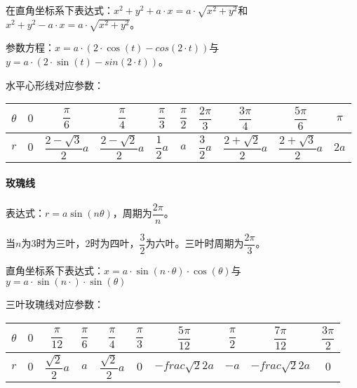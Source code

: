 在直角坐标系下表达式：$x^2+y^2+a\cdot x=a\cdot\sqrt{x^2+y^2}$和$x^2+y^2-a\cdot x=a\cdot\sqrt{x^2+y^2}$。

参数方程：$x=a\cdot(2\cdot\cos(t)-cos(2\cdot t))$与$y=a\cdot(2\cdot\sin(t)-sin(2\cdot t))$。

水平心形线对应参数： \leavevmode \medskip

\begin{tabular}{|c|c|c|c|c|c|c|c|c|c|}
    \hline
    $\theta$ & $0$ & $\dfrac{\pi}{6}$         & $\dfrac{\pi}{4}$         & $\dfrac{\pi}{3}$ & $\dfrac{\pi}{2}$ & $\dfrac{2\pi}{3}$ & $\dfrac{3\pi}{4}$        & $\dfrac{5\pi}{6}$        & $\pi$ \\ \hline
    $r$      & $0$ & $\dfrac{2-\sqrt{3}}{2}a$ & $\dfrac{2-\sqrt{2}}{2}a$ & $\dfrac{1}{2}a$  & $a$             & $\dfrac{3}{2}a$   & $\dfrac{2+\sqrt{2}}{2}a$ & $\dfrac{2+\sqrt{3}}{2}a$ & $2a$  \\
    \hline
\end{tabular}

\paragraph{玫瑰线} \leavevmode \medskip

\begin{minipage}{0.55\linewidth}
    表达式：$r=a\sin(n\theta)$，周期为$\dfrac{2\pi}{n}$。

    当$n$为3时为三叶，2时为四叶，$\dfrac{3}{2}$为六叶。三叶时周期为$\dfrac{2\pi}{3}$。

    直角坐标系下表达式：$x=a\cdot\sin(n\cdot\theta)\cdot\cos(\theta)$与$y=a\cdot\sin(n\cdot)\cdot\sin(\theta)$
\end{minipage}
\hfill
\begin{minipage}{0.35\linewidth}
\end{minipage}

三叶玫瑰线对应参数： \leavevmode \medskip

\begin{tabular}{|c|c|c|c|c|c|c|c|c|c|}
    \hline
    $\theta$ & $0$ & $\dfrac{\pi}{12}$      & $\dfrac{\pi}{6}$ & $\dfrac{\pi}{4}$       & $\dfrac{\pi}{3}$ & $\dfrac{5\pi}{12}$     & $\dfrac{\pi}{2}$ & $\dfrac{7\pi}{12}$     & $\dfrac{3\pi}{2}$ \\ \hline
    $r$      & $0$ & $\dfrac{\sqrt{2}}{2}a$ & $a$             & $\dfrac{\sqrt{2}}{2}a$ & $0$             & $-frac{\sqrt{2}}{2}a$ & $-a$            & $-frac{\sqrt{2}}{2}a$ & $0$              \\
    \hline
\end{tabular}


